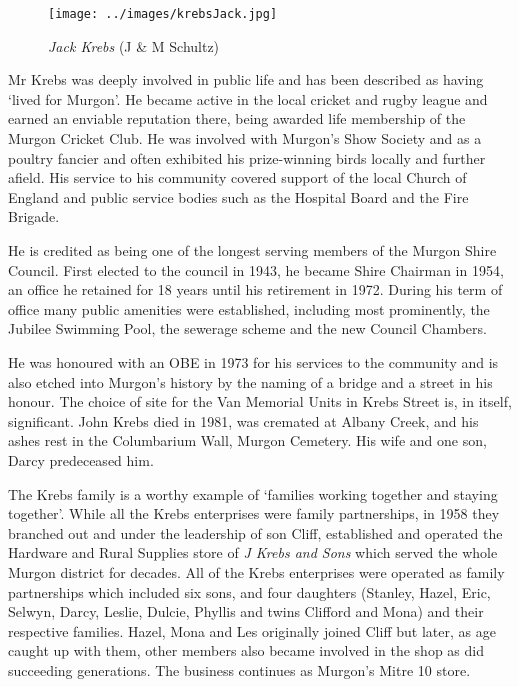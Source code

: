 \begin{figure}
\begin{center}
\texttt{[image: ../images/krebsJack.jpg]}
\caption{{\itshape Jack Krebs} {\scriptsize(J \& M Schultz)}}
\end{center}
\end{figure}




Mr Krebs was deeply involved in public life and has been described as having `lived for Murgon'. He became active in the local cricket and rugby league and earned an enviable reputation there, being awarded life membership of the Murgon Cricket Club. He was involved with Murgon's Show Society and as a poultry fancier and often exhibited his prize-winning birds locally and further afield. His service to his community covered support of the local Church of England and public service bodies such as the Hospital Board and the Fire Brigade.



He is credited as being one of the longest serving members of the Murgon Shire Council. First elected to the council in 1943, he became Shire Chairman in 1954, an office he retained for 18 years until his retirement in 1972. During his term of office many public amenities were established, including most prominently, the Jubilee Swimming Pool, the sewerage scheme and the new Council Chambers.



He was honoured with an OBE in 1973 for his services to the community and is also etched into Murgon's history by the naming of a bridge and a street in his honour. The choice of site for the Van Memorial Units in Krebs Street is, in itself, significant. John Krebs died in 1981, was cremated at Albany Creek, and his ashes rest in the Columbarium Wall, Murgon Cemetery. His wife and one son, Darcy predeceased him.



The Krebs family is a worthy example of `families working together and staying together'. While all the Krebs enterprises were family partnerships, in 1958 they branched out and under the leadership of son Cliff, established and operated the Hardware and Rural Supplies store of \emph{J Krebs and Sons} which served the whole Murgon district for decades. All of the Krebs enterprises were operated as family partnerships which included six sons, and four daughters (Stanley, Hazel, Eric, Selwyn, Darcy, Leslie, Dulcie, Phyllis and twins Clifford and Mona) and their respective families. Hazel, Mona and Les originally joined Cliff but later, as age caught up with them, other members also became involved in the shop as did succeeding generations. The business continues as Murgon's Mitre 10 store.









